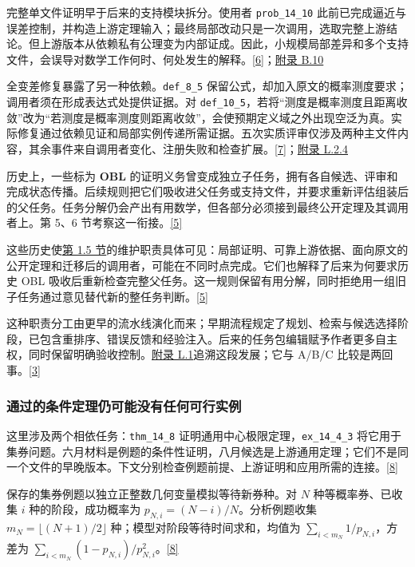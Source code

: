 完整单文件证明早于后来的支持模块拆分。使用者 \nolinkurl{prob_14_10} 此前已完成逼近与误差控制，并构造上游定理输入；最终局部改动只是一次调用，选取完整上游结论。但上游版本从依赖私有公理变为内部证成。因此，小规模局部差异和多个支持文件，会误导对数学工作何时、何处发生的解释。\href{zh.pdf\#ref-6}{\mbox{[6]}}；\href{zh-appendix.pdf\#b10}{附录 B.10}

全变差修复暴露了另一种依赖。\nolinkurl{def_8_5} 保留公式，却加入原文的概率测度要求；调用者须在形成表达式处提供证据。对 \nolinkurl{def_10_5}，若将“测度是概率测度且距离收敛”改为“若测度是概率测度则距离收敛”，会使预期定义域之外出现空泛为真。实际修复通过依赖见证和局部实例传递所需证据。五次实质评审仅涉及两种主文件内容，其余事件来自调用者变化、注册失败和检查扩展。\href{zh.pdf\#ref-7}{\mbox{[7]}}；\href{zh-appendix.pdf\#l2-4}{附录 L.2.4}

历史上，一些标为 \textbf{OBL} 的证明义务曾变成独立子任务，拥有各自候选、评审和完成状态传播。后续规则把它们吸收进父任务或支持文件，并要求重新评估组装后的父任务。任务分解仍会产出有用数学，但各部分必须接到最终公开定理及其调用者上。第 5、6 节考察这一衔接。\href{zh.pdf\#ref-5}{\mbox{[5]}}

这些历史使\href{zh.pdf\#section-1-5}{第 1.5 节}的维护职责具体可见：局部证明、可靠上游依据、面向原文的公开定理和迁移后的调用者，可能在不同时点完成。它们也解释了后来为何要求历史 OBL 吸收后重新检查完整父任务。这一规则保留有用分解，同时拒绝用一组旧子任务通过意见替代新的整任务判断。\href{zh.pdf\#ref-5}{\mbox{[5]}}

这种职责分工由更早的流水线演化而来；早期流程规定了规划、检索与候选选择阶段，已包含重排序、错误反馈和经验注入。后来的任务包编辑赋予作者更多自主权，同时保留明确验收控制。\href{zh-appendix.pdf\#l1}{附录 L.1}追溯这段发展；它与 A/B/C 比较是两回事。\href{zh.pdf\#ref-3}{\mbox{[3]}}

\subsubsection[通过的条件定理仍可能没有任何可行实例]{\texorpdfstring{\protect\hypertarget{r3-3}{}通过的条件定理仍可能没有任何可行实例}{通过的条件定理仍可能没有任何可行实例}}
这里涉及两个相依任务：\nolinkurl{thm_14_8} 证明通用中心极限定理，\nolinkurl{ex_14_4_3} 将它用于集券问题。六月材料是例题的条件性证明，八月候选是上游通用定理；它们不是同一个文件的早晚版本。下文分别检查例题前提、上游证明和应用所需的连接。\href{zh.pdf\#ref-8}{\mbox{[8]}}

保存的集券例题以独立正整数几何变量模拟等待新券种。对 $N$ 种等概率券、已收集 $i$ 种的阶段，成功概率为 $p_{N,i}=(N-i)/N$。分析例题收集 $m_N=\lfloor(N+1)/2\rfloor$ 种；模型对阶段等待时间求和，均值为 $\sum_{i<m_N}1/p_{N,i}$，方差为 $\sum_{i<m_N}(1-p_{N,i})/p_{N,i}^2$。\href{zh.pdf\#ref-8}{\mbox{[8]}}

